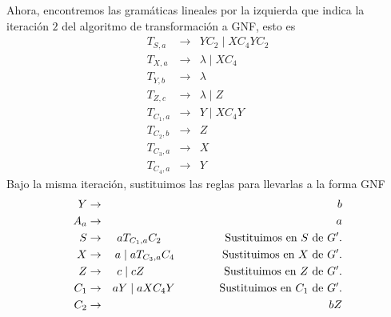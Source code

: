 \documentclass{article}
\begin{document}
\begin{enumerate}
    \begin{center}
    \end{center}
    Ahora, encontremos las gramáticas lineales por la izquierda que indica
    la iteración $2$ del algoritmo de transformación a GNF, esto es
    \begin{eqnarray*}
      T_{S,a} &\rightarrow& Y C_2\; |\; X C_4 Y C_2\\
      T_{X,a} &\rightarrow& \lambda\; |\; X C_4\;\\
      T_{Y,b} &\rightarrow& \lambda\\
      T_{Z,c} &\rightarrow& \lambda\; |\; Z\\
      T_{C_1,a} &\rightarrow& Y\; |\; X C_4 Y\\
      T_{C_2,b} &\rightarrow& Z\\
      T_{C_3,a} &\rightarrow& X\\
      T_{C_4,a} &\rightarrow& Y
    \end{eqnarray*}
    Bajo la misma iteración, sustituimos las reglas para llevarlas a la forma
    GNF
    \begin{eqnarray*}
      Y &\rightarrow& b\\
      A_a &\rightarrow& a\\
      S &\rightarrow& a T_{C_1, a} C_2
      \hspace*{2cm} \text{Sustituimos en } S \text{ de } G'.\\
      X &\rightarrow& a\; |\; a T_{C_3, a} C_4
      \hspace*{1.5cm} \text{Sustituimos en } X \text{ de } G'.\\
      Z &\rightarrow& c\; |\; c Z
      \hspace*{2.5cm} \text{Sustituimos en } Z \text{ de } G'.\\
      C_1 &\rightarrow& aY\; |\; a X C_4 Y
      \hspace*{1.4cm} \text{Sustituimos en } C_1 \text{ de } G'.\\
      C_2 &\rightarrow& bZ

\end{eqnarray*}
\end{enumerate}
\end{document}
